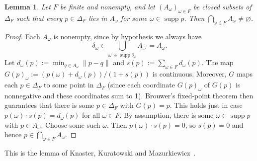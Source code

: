 \documentclass[11pt]{article}
\newtheorem{lemma}[theorem]{Lemma}
\theoremstyle{definition}
\newcommand{\supp}{\operatorname{supp}}
\begin{document}
\begin{lemma}\label{lem:kkm}
Let $F$ be finite and nonempty, and let $(A_\omega)_{\omega\in F}$ be closed subsets of $\Delta_F$ such that every $p\in\Delta_F$ lies in $A_\omega$ for some $\omega\in\supp p$. Then $\bigcap_{\omega\in F}A_\omega\ne\varnothing$.
\end{lemma}
\begin{proof}
Each $A_\omega$ is nonempty, since by hypothesis we always have 
\[
\delta_\omega\in\bigcup_{\omega^\prime\in\supp \delta_\omega}A_{\omega^\prime}=A_\omega.
\]
Let $d_\omega(p):=\min_{q\in A_\omega}\lVert p-q \rVert$ and $s(p):=\sum_{\omega\in F} d_\omega(p)$. The map $G(p)_\omega:=(p(\omega)+d_\omega(p))/(1+s(p))$ is continuous. Moreover, $G$ maps each $p\in\Delta_F$ to some point in $\Delta_F$ (since each coordinate $G(p)_\omega$ of $G(p)$ is nonnegative and these coordinates sum to 1). Brouwer's fixed-point theorem then guarantees that there is some $p\in\Delta_F$ with $G(p)=p$. This holds just in case $p(\omega)\cdot s(p)=d_\omega(p)$ for all $\omega\in F$. By assumption, there is some $\omega\in\supp p$ with $p\in A_\omega$. Choose some such $\omega$. Then $p(\omega)\cdot s(p)=0$, so $s(p)=0$ and hence $p\in\bigcap_{\omega\in F}A_\omega$.
\end{proof}

This is the lemma of Knaster, Kuratowski and Mazurkiewicz~\cite{KKM}.
\end{document}
